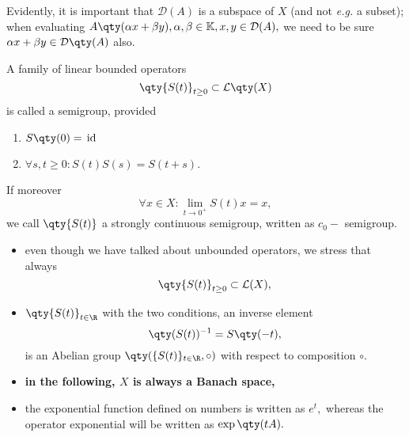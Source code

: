 \begin{remark}
	Evidently, it is important that $\mathcal{D}(A)$ is a subspace of $X$ (and not \textit{e.g.} a subset); when evaluating $A\qty(\alpha x + \beta y), \alpha, \beta \in \mathbb{K}, x, y \in \mathcal{D}(A),$ we need to be sure $\alpha x + \beta y \in \mathcal{D}\qty(A)$ also.
\end{remark}

\begin{definition}
	A family of linear bounded operators
	\[
		\qty{S(t)}_{t \geq 0} \subset \mathcal{L}\qty(X)
	\]
	is called a semigroup, provided 
	\begin{enumerate}
		\item $S\qty(0) = \, \text{id} \,$
		\item $\forall s,t \geq 0: S(t) S(s) = S(t+s).$
	\end{enumerate}
	If moreover
	\[
		\forall x \in X: \lim_{t \to 0^+}S(t)x = x,
	\]
	we call $\qty{S(t)}$ a strongly continuous semigroup, written as $c_0-$ semigroup.
\end{definition}
\begin{remark}
	\begin{itemize}
		\item even though we have talked about unbounded operators, we stress that always
			\[
				\qty{S(t)}_{t \geq 0} \subset \mathcal{L}(X),
			\]
		\item 	$\qty{S(t)}_{t\in \R}$ with the two conditions, an inverse element 
			\[
				\qty(S(t))^{-1} = S\qty(-t),
			\]
			is an Abelian group $\qty(\{S(t)\}_{t\in \R}, \circ)$ with respect to composition $\circ.$
	\end{itemize}

\end{remark}

\begin{remark}
	\begin{itemize}
		\item \textbf{in the following, $X$ is always a Banach space,}
		\item the exponential function defined on numbers is written as $e^t,$ whereas the operator exponential will be written as $\exp\qty(tA).$
	\end{itemize}
\end{remark}

